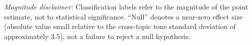 \begin{table}[htbp]
\begin{minipage}{0.95\textwidth}
\emph{Magnitude disclaimer:} Classification labels refer to the magnitude of the point estimate, not to statistical significance. ``Null'' denotes a near-zero effect size (absolute value small relative to the cross-topic tone standard deviation of approximately $3.5$), not a failure to reject a null hypothesis.
\end{minipage}
\end{table}
